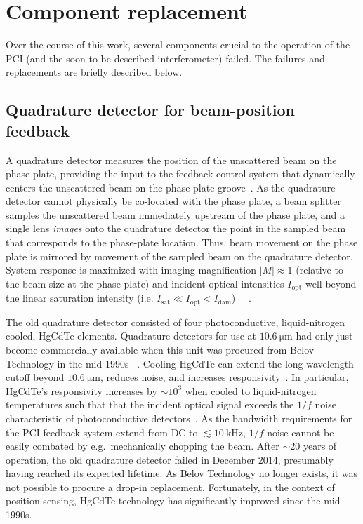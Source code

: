 \section{Component replacement}
Over the course of this work,
several components crucial to the operation of the PCI
(and the soon-to-be-described interferometer)
failed.
The failures and replacements are briefly described below.


\subsection{Quadrature detector for beam-position feedback}
A quadrature detector measures the position
of the unscattered beam on the phase plate,
providing the input to the feedback control system
that dynamically centers the unscattered beam
on the phase-plate groove~\cite[Sec.~3.5]{coda_phd}.
As the quadrature detector
cannot physically be co-located with the phase plate,
a beam splitter samples the unscattered beam
immediately upstream of the phase plate, and
a single lens \emph{images} onto the quadrature detector
the point in the sampled beam that corresponds to the phase-plate location.
Thus, beam movement on the phase plate is mirrored
by movement of the sampled beam on the quadrature detector.
System response is maximized
with imaging magnification $|M| \approx 1$
(relative to the beam size at the phase plate) and
incident optical intensities $I_{\text{opt}}$
well beyond the linear saturation intensity
(i.e. $I_{\text{sat}} \ll I_{\text{opt}} < I_{\text{dam}}$)
~\cite{marinoni_FB_detector_report}~\cite[Sec.~3.5(b)]{coda_phd}.

The old quadrature detector consisted of four
photoconductive, liquid-nitrogen cooled, HgCdTe elements.
Quadrature detectors for use at $\SI{10.6}{\micro\meter}$
had only just become commercially available
when this unit was procured from Belov Technology in the mid-1990s
~\cite[Sec.~3.5(b)]{coda_phd}.
Cooling HgCdTe can
extend the long-wavelength cutoff beyond $\SI{10.6}{\micro\meter}$,
reduces noise, and
increases responsivity~\cite{vigo_catalog}.
In particular, HgCdTe's responsivity increases by $\sim 10^3$
when cooled to liquid-nitrogen temperatures such that
that the incident optical signal
exceeds the $1 / f$ noise
characteristic of photoconductive detectors~\cite{vigo_catalog}.
As the bandwidth requirements for the PCI feedback system
extend from DC to $\lesssim \SI{10}{\kilo\hertz}$,
$1 / f$ noise cannot be easily combated by
e.g.\ mechanically chopping the beam.
After $\sim 20$ years of operation,
the old quadrature detector failed in December 2014,
presumably having reached its expected lifetime.
As Belov Technology no longer exists,
it was not possible to procure a drop-in replacement.
Fortunately, in the context of position sensing,
HgCdTe technology has significantly improved since the mid-1990s.

